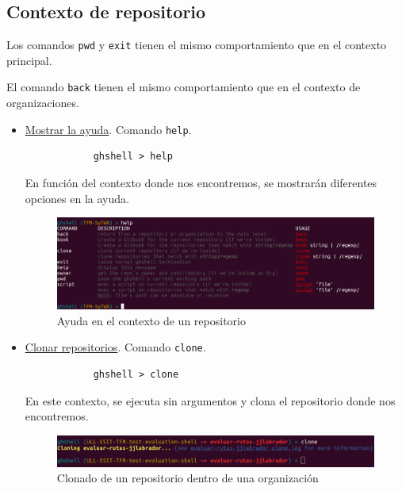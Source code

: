 \subsection{Contexto de repositorio}
\label{subsec:b.2.3}

	Los comandos \verb|pwd| y \verb|exit| tienen el mismo comportamiento que en el contexto principal. 
\bigskip
	
	El comando \verb|back| tienen el mismo comportamiento que en el contexto de organizaciones.
	
\begin{itemize}

	\item \underline{Mostrar la ayuda}. Comando \verb|help|.
		
		\begin{verbatim}
			ghshell > help
		\end{verbatim}
		
		En función del contexto donde nos encontremos, se mostrarán diferentes opciones en la ayuda.
				
		\begin{figure}[H]
		\begin{center}
		\includegraphics[width=1\textwidth]{images/help1-3}
		\caption{Ayuda en el contexto de un repositorio}
		\label{fig:help1-2}
		\end{center}
		\end{figure}

	\item \underline{Clonar repositorios}. Comando \verb|clone|.
	
		\begin{verbatim}
			ghshell > clone
		\end{verbatim}
		
		En este contexto, se ejecuta sin argumentos y clona el repositorio donde nos encontremos.
		
		\begin{figure}[H]
		\begin{center}
		\includegraphics[width=1\textwidth]{images/clone1-4}
		\caption{Clonado de un repositorio dentro de una organización}
		\label{fig:clone1-4}
		\end{center}
		\end{figure}


\end{itemize}
